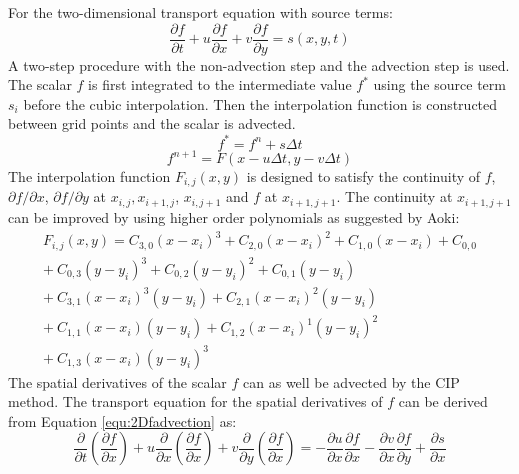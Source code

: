 For the two-dimensional transport equation with source terms:
\begin{equation}
\frac {\partial f}{\partial t} + u \frac {\partial f}{\partial x}+
v \frac {\partial f}{\partial y}=s(x,y,t) \label{equ:2Dfadvection}
\end{equation}
A two-step procedure with the non-advection step and the advection
step is used. The scalar $f$ is first integrated to the intermediate value $f^*$ using the source term $s_i$ before the cubic interpolation. Then the interpolation function is constructed between grid points and the scalar is advected.
\begin{equation}
f^*=f^n+ s \Delta t \label{equ:fnonadvection}
\end{equation}
\begin{equation}
f^{n+1}=F(x-u\Delta t, y-v\Delta t)
\end{equation}
The interpolation function $F_{i,j}(x,y)$ is designed to satisfy the continuity
of $f$, ${\partial f/\partial x}$, ${\partial f/\partial y}$ at
$x_{i,j}, x_{i+1,j}$, $x_{i,j+1}$ and $f$ at $ x_{i+1,j+1} $.
The continuity at $ x_{i+1,j+1} $ can be improved by
using higher order polynomials as suggested by Aoki:
\begin{eqnarray}
F_{i,j}(x,y)=C_{3,0}(x-x_i)^3+C_{2,0}(x-x_i)^2+C_{1,0}(x-x_i)+C_{0,0}\nonumber \\
+\ C_{0,3}(y-y_i)^3+C_{0,2}(y-y_i)^2+C_{0,1}(y-y_i)\nonumber \\
+\ C_{3,1}(x-x_i)^3(y-y_i)+C_{2,1}(x-x_i)^2(y-y_i)\nonumber \\
+\ C_{1,1}(x-x_i)(y-y_i)+C_{1,2}(x-x_i)^1(y-y_i)^2\nonumber \\
+\ C_{1,3}(x-x_i)(y-y_i)^3
\end{eqnarray} %
The spatial derivatives of the scalar $f$ can as well be advected by the CIP method.
The transport equation for the spatial derivatives of $f$ can be derived from Equation \ref{equ:2Dfadvection} as:
\begin{equation}
\frac {\partial}{\partial t}(\frac{\partial f}{\partial x})  + u
\frac {\partial}{\partial x}(\frac {\partial f}{\partial x})+ v
\frac {\partial}{\partial y}(\frac {\partial f}{\partial x})=
-\frac {\partial u}{\partial x}\frac {\partial f}{\partial x}
-\frac {\partial v}{\partial x}\frac {\partial f}{\partial y}+
\frac{\partial s}{\partial x}
\end{equation}
